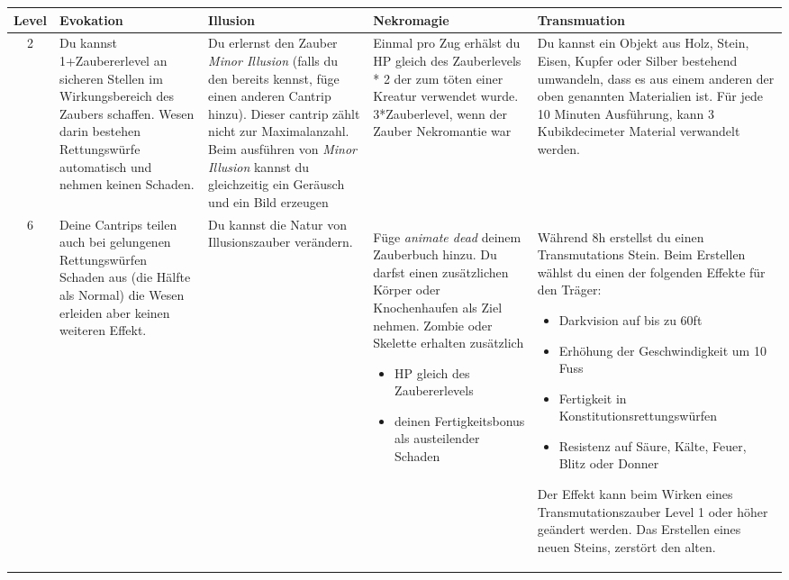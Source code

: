 \clearpage
\begin{table}
	\centering
	\begin{tabular}{cp{6cm}p{6cm}p{6cm}p{6cm}}
	\textbf{Level} & \textbf{Evokation} & \textbf{Illusion} &
	\textbf{Nekromagie} & \textbf{Transmuation}\\ \hline
	
	2 & Du kannst 1+Zaubererlevel an sicheren Stellen im Wirkungsbereich des Zaubers schaffen. Wesen darin bestehen Rettungswürfe automatisch und nehmen keinen Schaden.
	& Du erlernst den Zauber \textit{Minor Illusion} (falls du den bereits kennst, füge einen anderen Cantrip hinzu). Dieser cantrip zählt nicht zur Maximalanzahl.
	Beim ausführen von \textit{Minor Illusion} kannst du gleichzeitig ein Geräusch und ein Bild erzeugen
	& Einmal pro Zug erhälst du HP gleich des Zauberlevels * 2 der zum töten einer Kreatur verwendet wurde. 3*Zauberlevel, wenn der Zauber Nekromantie war
	& Du kannst ein Objekt aus Holz, Stein, Eisen, Kupfer oder Silber bestehend umwandeln, dass es aus einem anderen der oben genannten Materialien ist.
	Für jede 10 Minuten Ausführung, kann 3 Kubikdecimeter Material verwandelt werden.
	\\ \hline
	
	6 & Deine Cantrips teilen auch bei gelungenen Rettungswürfen Schaden aus (die Hälfte als Normal) die Wesen erleiden aber keinen weiteren Effekt.
	& Du kannst die Natur von Illusionszauber verändern.
	& Füge \textit{animate dead} deinem Zauberbuch hinzu. Du darfst einen zusätzlichen Körper oder Knochenhaufen als Ziel nehmen. Zombie oder Skelette erhalten zusätzlich
	\begin{itemize}
		\item HP gleich des Zaubererlevels
		\item deinen Fertigkeitsbonus als austeilender Schaden
	\end{itemize}
	& Während 8h erstellst du einen Transmutations Stein. Beim Erstellen wählst du einen der folgenden Effekte für den Träger:
	\begin{itemize}
		\item Darkvision auf bis zu 60ft
		\item Erhöhung der Geschwindigkeit um 10 Fuss
		\item Fertigkeit in Konstitutionsrettungswürfen
		\item Resistenz auf Säure, Kälte, Feuer, Blitz oder Donner
	\end{itemize}
	Der Effekt kann beim Wirken eines Transmutationszauber Level 1 oder höher geändert werden. Das Erstellen eines neuen Steins, zerstört den alten.
	\\ \hline
	

\end{tabular}
\end{table}
